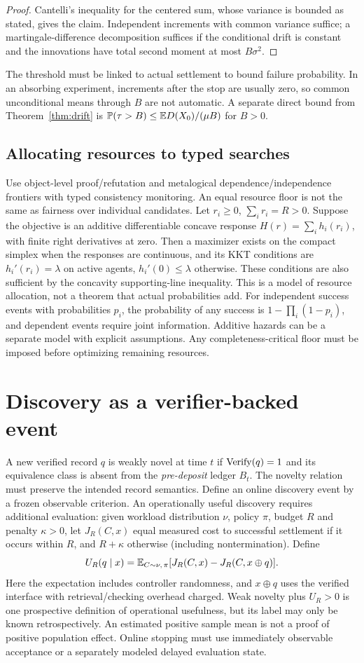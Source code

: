 \documentclass[11pt]{article}
\theoremstyle{definition}\newtheorem{definition}[theorem]{Definition}\newtheorem{example}[theorem]{Example}\newtheorem{conjecture}[theorem]{Conjecture}
\begin{document}
\begin{proof} Cantelli's inequality for the centered sum, whose variance is bounded as stated, gives the claim. Independent increments with common variance suffice; a martingale-difference decomposition suffices if the conditional drift is constant and the innovations have total second moment at most $B\sigma^2$.\end{proof}
The threshold must be linked to actual settlement to bound failure probability. In an absorbing experiment, increments after the stop are usually zero, so common unconditional means through $B$ are not automatic. A separate direct bound from Theorem~\ref{thm:drift} is $\mathbb P(\tau>B)\le\mathbb E D(X_0)/(\mu B)$ for $B>0$.
\subsection{Allocating resources to typed searches}
Use object-level proof/refutation and metalogical dependence/independence frontiers with typed consistency monitoring. An equal resource floor is not the same as fairness over individual candidates. Let $r_i\ge0$, $\sum_i r_i=R>0$. Suppose the objective is an additive differentiable concave response $H(r)=\sum_i h_i(r_i)$, with finite right derivatives at zero. Then a maximizer exists on the compact simplex when the responses are continuous, and its KKT conditions are $h_i'(r_i)=\lambda$ on active agents, $h_i'(0)\le\lambda$ otherwise. These conditions are also sufficient by the concavity supporting-line inequality. This is a model of resource allocation, not a theorem that actual probabilities add. For independent success events with probabilities $p_i$, the probability of any success is $1-\prod_i(1-p_i)$, and dependent events require joint information. Additive hazards can be a separate model with explicit assumptions. Any completeness-critical floor must be imposed before optimizing remaining resources.
\section{Discovery as a verifier-backed event}
A new verified record $q$ is weakly novel at time $t$ if $\operatorname{Verify}(q)=1$ and its equivalence class is absent from the \emph{pre-deposit} ledger $B_t$. The novelty relation must preserve the intended record semantics. Define an online discovery event by a frozen observable criterion. An operationally useful discovery requires additional evaluation: given workload distribution $\nu$, policy $\pi$, budget $R$ and penalty $\kappa>0$, let $J_R(C,x)$ equal measured cost to successful settlement if it occurs within $R$, and $R+\kappa$ otherwise (including nontermination). Define
\[U_R(q\mid x)=\mathbb E_{C\sim\nu,\,\pi}[J_R(C,x)-J_R(C,x\oplus q)].\]
Here the expectation includes controller randomness, and $x\oplus q$ uses the verified interface with retrieval/checking overhead charged. Weak novelty plus $U_R>0$ is one prospective definition of operational usefulness, but its label may only be known retrospectively. An estimated positive sample mean is not a proof of positive population effect. Online stopping must use immediately observable acceptance or a separately modeled delayed evaluation state.
\end{document}
